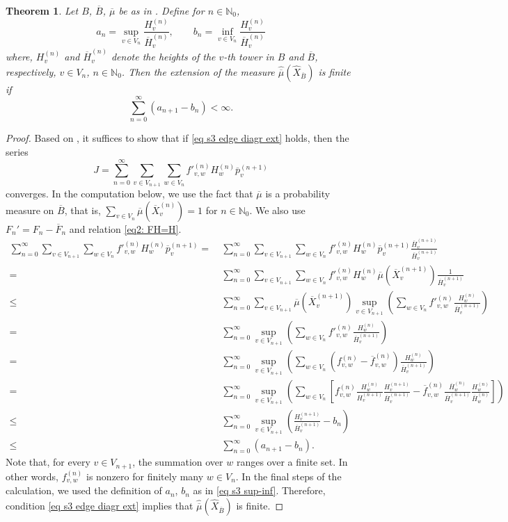 \documentclass[11pt,reqno]{amsart}
\theoremstyle{definition}
\theoremstyle{remark}
\theoremstyle{plain}
\newtheorem{thm}[definition]{Theorem}
\def\ol{\overline}
\def\ov{\overline}
\def\wh{\widehat}
\newcommand{\N}{\mathbb N}
\newcommand{\be}{\begin{equation}}
\newcommand{\ee}{\end{equation}}
\numberwithin{equation}{section}
\begin{document}
\begin{thm}
Let $B$, $\ov B$, $\ov \mu$ be as in . 
Define for $n \in \N_0$,
\be\label{eq s3 sup-inf}
a_n = \sup_{v \in V_n} \frac{H_v^{(n)}}{\ol H_v^{(n)}},\qquad
b_n = \inf_{v \in V_n} \frac{H_v^{(n)}}{\ol H_v^{(n)}}
\ee
where, $H_v^{(n)}$ and $\ol H_v^{(n)}$ denote the heights of the $v$-th tower in $B$ and $\ol B$, respectively, $v \in V_n$, $n \in \N_0$.
Then the extension of the measure $\widehat{\overline{\mu}}(\wh X_{\ov B})$ is finite if 
\be \label{eq s3 edge diagr ext}
\sum_{n=0}^\infty (a_{n+1} - b_n) < \infty.
\ee
\end{thm}

\begin{proof} Based on , it suffices to show that if \eqref{eq s3 edge diagr ext} holds, then the series
$$
J = \sum_{n=0}^\infty \sum_{v \in V_{n+1}} \sum_{w \in V_n} {f'}_{v,w}^{(n)} H_w^{(n)} \ov p_v^{(n+1)}
$$
converges. In the computation below, we use the fact that $\ol\mu$ is a probability measure on $\ol B$, that is, $\sum_{v \in V_{n}} \ov \mu (\ov X_v^{(n)}) = 1$ for $n \in \N_0$. We also use $F_n' = F_n - \ol F_n$ and relation \eqref{eq2: FH=H}.
\begin{align*}
\sum_{n=0}^\infty\sum_{v \in V_{n+1}} \sum_{w \in V_n} {f'}_{v,w}^{(n)} H_w^{(n)} \ov p_v^{(n+1)} =&\ \sum_{n=0}^\infty \sum_{v \in V_{n+1}} \sum_{w \in V_n} {f'}_{v,w}^{(n)} H_w^{(n)} \ov p_v^{(n+1)} \frac{\ov H_v^{(n+1)}}{\ov H_v^{(n+1)}}  \\
 =&\ \sum_{n=0}^\infty\sum_{v \in V_{n+1}} \sum_{w \in V_n} 
 {f'}_{v,w}^{(n)} H_w^{(n)} \ov \mu (\ov X_v^{(n+1)}) \frac{1}{\ov H_v^{(n+1)}}  \\
 \leq &\  \sum_{n=0}^\infty \sum_{v \in V_{n+1}} \ov \mu (\ov X_v^{(n+1)}) \sup_{v \in V_{n+1}} \left( \sum_{w \in V_n} {f'}_{v,w}^{(n)} \frac{H_w^{(n)}}{\ov H_v^{(n+1)}} \right)\\
  = & \ \sum_{n=0}^\infty \sup_{v \in V_{n+1}} \left( \sum_{w \in V_n} {f'}_{v,w}^{(n)} \frac{H_w^{(n)}}{\ov H_v^{(n+1)}} \right)\\
= &\ \sum_{n=0}^\infty \sup_{v \in V_{n+1}} \left( \sum_{w \in V_n}
(f_{v,w}^{(n)} - \ol f_{v,w}^{(n)}) \frac{H_w^{(n)}}{\ov H_v^{(n+1)}} \right) \\
= &\ \sum_{n=0}^\infty \sup_{v \in V_{n+1}} \left( \sum_{w \in V_n}
[f_{v,w}^{(n)}\frac{H_w^{(n)}}{ H_v^{(n+1)}}\frac{H_v^{(n+1)}}{\ol H_v^{(n+1)}} - \ol f_{v,w}^{(n)} \frac{\ol H_w^{(n)}}
{\ol H_v^{(n+1)}} \frac{H_w^{(n)}}{\ol H_w^{(n)}}]\right)\\
\leq  &\ \sum_{n=0}^\infty \sup_{v \in V_{n+1}} \left( \frac{H_v^{(n+1)}}{\ol H_v^{(n+1)}} - b_n\right)\\
\leq &\ \sum_{n=0}^\infty (a_{n+1} - b_n).
\end{align*}
Note that, for every $v \in V_{n+1}$, the summation over
$w$ ranges over a finite set. In other words, $f_{v,w}^{(n)}$ is nonzero for finitely many $w \in V_n$. 
In the final steps of the calculation, we used the definition of $a_n$, $b_n$ as in \eqref{eq s3 sup-inf}. 
Therefore, condition \eqref{eq s3 edge diagr ext} implies that
$\widehat{\overline{\mu}}(\wh X_{\ov B})$ is finite. 
\end{proof}
\end{document}
